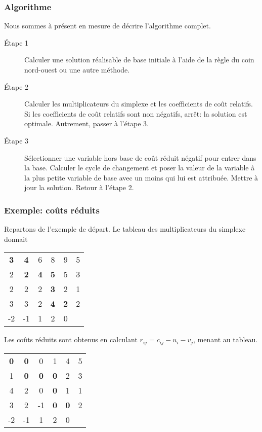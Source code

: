 \documentclass[usepdftitle=false, aspectratio=169]{beamer}
\begin{document}
\begin{frame}
	\frametitle{Algorithme}
	
Nous sommes à présent en mesure de décrire l'algorithme complet.

\begin{description}
\item[Étape 1]
Calculer une solution réalisable de base initiale à l'aide de la règle du coin nord-ouest ou une autre méthode.
\item[Étape 2]
Calculer les multiplicateurs du simplexe et les coefficients de coût relatifs.
Si les coefficients de coût relatifs sont non négatifs, arrêt: la solution est optimale. Autrement,
passer à l'étape 3.
\item[Étape 3]
Sélectionner une variable hors base de coût réduit négatif pour entrer dans la base.
Calculer le cycle de changement et poser la valeur de la variable à la plus petite variable de base avec un moins qui lui est attribuée.
Mettre à jour la solution. Retour à l'étape 2.
\end{description}

\end{frame}

\begin{frame}
\frametitle{Exemple: coûts réduits}

Repartons de l'exemple de départ. Le tableau des multiplicateurs du simplexe donnait
\begin{center}
	\begin{tabular}{ccccc|c}
		{\bf 3} & {\bf 4} & 6 & 8 & 9 & 5 \\
		2 & {\bf 2} & {\bf 4} & {\bf 5} & 5 & 3 \\
		2 & 2 & 2 & {\bf 3} & 2 & 1 \\
		3 & 3 & 2 & {\bf 4} & {\bf 2} & 2 \\
		\hline
		-2 & -1 & 1 & 2 & 0 & 
	\end{tabular}
\end{center}
Les coûts réduits sont obtenus en calculant $r_{ij} = c_{ij} - u_i - v_j$, menant au tableau.
\begin{center}
	\begin{tabular}{ccccc|c}
		{\bf 0} & {\bf 0} & 0 & 1 & 4 & 5 \\
		1 & {\bf 0} & {\bf 0} & {\bf 0} & 2 & 3 \\
		4 & 2 & 0 & {\bf 0} & 1 & 1 \\
		3 & 2 & -1 & {\bf 0} & {\bf 0} & 2 \\
		\hline
		-2 & -1 & 1 & 2 & 0 & 
	\end{tabular}
\end{center}

\end{frame}
\end{document}
